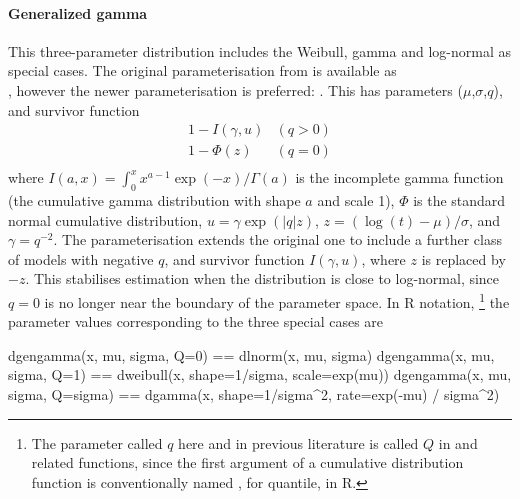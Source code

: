 \documentclass[nojss,nofooter]{jss}
\begin{document}
\paragraph{Generalized gamma} This three-parameter distribution
includes the Weibull, gamma and log-normal as special cases.  The
original parameterisation from \citet{stacy:gengamma} is available as\\
, however the newer parameterisation
\citep{prentice:loggamma} is preferred: .  This has
parameters ($\mu$,$\sigma$,$q$), and survivor function
\[
\begin{array}{ll}
1 - I(\gamma,u)   & (q > 0)\\
1 - \Phi(z)  & (q = 0)\\
\end{array}
\]
where $I(a,x) = \int_0^x x^{a-1}\exp(-x)/\Gamma(a)$ is the incomplete gamma function (the cumulative gamma distribution with shape $a$ and scale 1), $\Phi$ is the standard normal cumulative distribution,  $u = \gamma \exp(|q|z)$, $z=(\log(t) - \mu)/\sigma$, and $\gamma=q^{-2}$.   The \citet{prentice:loggamma} parameterisation extends the original one to include a further class of models with negative $q$, and survivor function $I(\gamma,u)$, where $z$ is replaced by $-z$.   This stabilises estimation when the distribution is close to log-normal, since $q=0$ is no longer near the boundary of the parameter space.    In R notation, \footnote{The parameter called $q$ here and in previous literature is called $Q$ in  and related functions, since the first argument of a cumulative distribution function is conventionally named , for quantile, in R.} the parameter values corresponding to the three special cases are

\begin{Code}
dgengamma(x, mu, sigma, Q=0)     ==  dlnorm(x, mu, sigma)                                
dgengamma(x, mu, sigma, Q=1)     ==  dweibull(x, shape=1/sigma, scale=exp(mu))           
dgengamma(x, mu, sigma, Q=sigma) ==  dgamma(x, shape=1/sigma^2, 
                                               rate=exp(-mu) / sigma^2)  
\end{Code}
\end{document}
